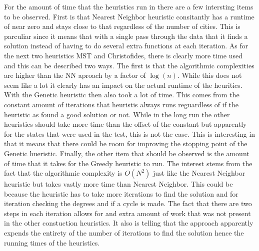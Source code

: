 \documentclass[midd]{thesis}
\newcommand{\tab}{\hspace*{2em}}
\begin{document}
\tab For the amount of time that the heuristics run in there are a few intersting items to be observed. First is that Nearest Neighbor heuristic consitantly has a runtime of near zero and stays close to that regardless of the number of cities. This is parculiar since it means that with a single pass through the data that it finds a solution instead of having to do several extra functions at each iteration. As for the next two heuristics MST and Christofides, there is clearly more time used and this can be described two ways. The first is that the algorithmic complexities are higher than the NN aproach by a factor of $\log(n)$. While this does not seem like a lot it clearly has an impact on the actual runtime of the heuritics. With the Genetic heuristic then also took a lot of time. This comes from the constant amount of iterations that heuristis always runs reguardless of if the heuristic as found a good solution or not. While in the long run the other heuristics should take more time than the offset of the constant but apparently for the states that were used in the test, this is not the case. This is interesting in that it means that there could be room for improving the stopping point of the Genetic hueristic. Finally, the other item that should be observed is the amount of time that it takes for the Greedy heuristic to run. The interest stems from the fact that the algorithmic complexity is $O(N^2)$ just like the Nearest Neighbor heuristic but takes vastly more time than Nearest Neighbor. This could be because the heuristic has to take more iterations to find the solution and for iteration checking the degrees and if a cycle is made. The fact that there are two steps in each iteration allows for and extra amount of work that was not present in the other constuction heuristics. It also is telling that the approach apparently expends the entirety of the number of iterations to find the solution hence the running times of the heuristics.\\
\end{document}
